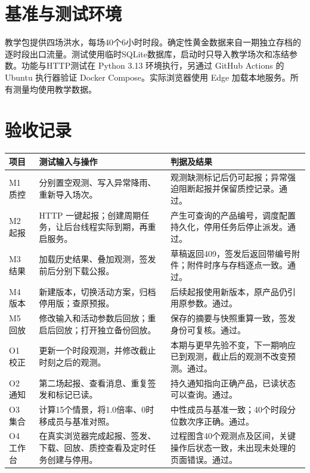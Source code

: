 
\section{基准与测试环境}
教学包提供四场洪水，每场40个6小时时段。确定性黄金数据来自一期独立存档的逐时段出口流量。测试使用临时SQLite数据库，启动时只导入教学场次和冻结参数。功能与HTTP测试在 Python 3.13 环境执行，另通过 GitHub Actions 的 Ubuntu 执行器验证 Docker Compose。实际浏览器使用 Edge 加载本地服务。所有测量均使用教学数据。
\section{验收记录}
\noindent\begin{tabularx}{\linewidth}{@{}p{2.2cm}LL@{}}\toprule 项目 & 测试输入与操作 & 判据及结果\\\midrule
M1 质控 & 分别置空观测、写入异常降雨、重新导入场次。 & 观测缺测标记后仍可起报；异常强迫阻断起报并保留质控记录。通过。\\
M2 起报 & HTTP 一键起报；创建周期任务，让后台线程实际到期，再重启服务。 & 产生可查询的产品编号，调度配置持久化，停用任务后停止派发。通过。\\
M3 结果 & 加载历史结果、叠加观测，签发前后分别下载公报。 & 草稿返回409，签发后返回带编号附件；附件时序与存档逐点一致。通过。\\
M4 版本 & 新建版本，切换活动方案，归档停用版；查原预报。 & 后续起报使用新版本，原产品仍引用原参数。通过。\\
M5 回放 & 修改输入和活动参数后回放；重启后回放；打开独立备份回放。 & 保存的摘要与快照重算一致，签发身份可复核。通过。\\
O1 校正 & 更新一个时段观测，并修改截止时刻之后的观测。 & 本期与更早先验不变，下一期响应已到观测，截止后的观测不改变预测。通过。\\
O2 通知 & 第二场起报、查看消息、重复签发和标记已读。 & 持久通知指向正确产品，已读状态可以查询。通过。\\
O3 集合 & 计算15个情景，将1.0倍率、0时移成员与基准对照。 & 中性成员与基准一致；40个时段分位数次序正确。通过。\\
O4 工作台 & 在真实浏览器完成起报、签发、下载、回放、质控查看及定时任务创建与停用。 & 过程图含40个观测点及区间，关键操作后状态一致，未出现未处理的页面错误。通过。\\\bottomrule\end{tabularx}
